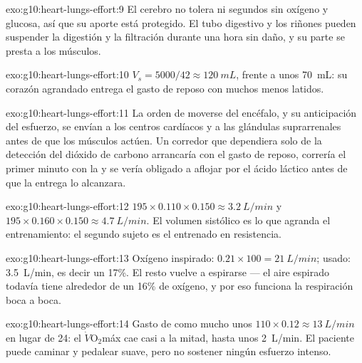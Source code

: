 \begin{solution}{exo:g10:heart-lungs-effort:9}
El cerebro no tolera ni segundos sin oxígeno y glucosa, así que su
aporte está protegido. El tubo digestivo y los riñones pueden suspender
la digestión y la filtración durante una hora sin daño, y su parte se
presta a los músculos.
\end{solution}

\begin{solution}{exo:g10:heart-lungs-effort:10}
$V_s = 5000/42 \approx \qty{120}{mL}$, frente a unos \qty{70}{mL}: su
corazón agrandado entrega el gasto de reposo con muchos menos latidos.
\end{solution}

\begin{solution}{exo:g10:heart-lungs-effort:11}
La orden de moverse del encéfalo, y su anticipación del esfuerzo, se
envían a los centros cardíacos y a las glándulas suprarrenales antes de
que los músculos actúen. Un corredor que dependiera solo de la
detección del dióxido de carbono arrancaría con el gasto de reposo,
correría el primer minuto con la  y se vería obligado a
aflojar por el ácido láctico antes de que la entrega lo alcanzara.
\end{solution}

\begin{solution}{exo:g10:heart-lungs-effort:12}
$195 \times 0.110 \times 0.150 \approx \qty{3.2}{L/min}$ y
$195 \times 0.160 \times 0.150 \approx \qty{4.7}{L/min}$. El volumen
sistólico es lo que agranda el entrenamiento: el segundo sujeto es el
entrenado en resistencia.
\end{solution}

\begin{solution}{exo:g10:heart-lungs-effort:13}
Oxígeno inspirado: $0.21 \times 100 = \qty{21}{L/min}$; usado:
\qty{3.5}{L/min}, es decir un 17\%. El resto vuelve a espirarse --- el
aire espirado todavía tiene alrededor de un 16\% de oxígeno, y por eso
funciona la respiración boca a boca.
\end{solution}

\begin{solution}{exo:g10:heart-lungs-effort:14}
Gasto de como mucho unos $110 \times 0.12 \approx \qty{13}{L/min}$ en
lugar de 24: el $\dot V\!\mathrm{O_2}$máx cae casi a la mitad, hasta
unos \qty{2}{L/min}. El paciente puede caminar y pedalear suave, pero
no sostener ningún esfuerzo intenso.
\end{solution}

